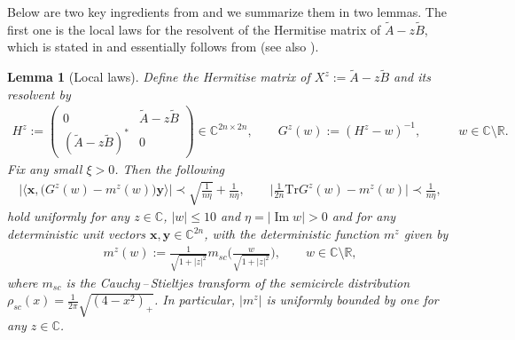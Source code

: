 \documentclass[10pt,reqno]{amsart}
\numberwithin{equation}{section}
\numberwithin{figure}{section}
\theoremstyle{plain}
\newtheorem{lemma}[theorem]{Lemma}
\newcommand{\R}{{\mathbb{R}}}
\newcommand{\C}{{\mathbb{C}}}
\newcommand{\A}{{\tilde{A}}}
\newcommand{\B}{{\tilde{B}}}
\newcommand{\<}{\langle}
\renewcommand{\>}{\rangle}
\renewcommand{\Im}{\operatorname{Im}}
\begin{document}
Below are two key ingredients from \cite{chafai-garcia-zelada-xu} and we summarize them in two lemmas. The first one is the local laws for the resolvent of the Hermitise matrix of $\A-z\B$, which is stated in \cite{chafai-garcia-zelada-xu} and essentially follows from \cite{zbMATH06347297} (see also \cite{zbMATH06221300,zbMATH06261246,zbMATH06330939}).
\begin{lemma}[Local laws]\label{lemma_local_law}
Define the Hermitise matrix of $X^z:=\A-z\B$ and its resolvent by
\begin{align}\label{eq_hermitise}
    H^{z}:=\begin{pmatrix}
		0  &   \A-z\B \\
		(\A-z\B)^*    & 0
	\end{pmatrix}  \in \C^{2n \times 2n}, \qquad G^{z}(w):=(H^{z}-w)^{-1}, \qquad \quad w \in \mathbb{C} \setminus \mathbb{R}.
\end{align}
Fix any small $\xi>0$. Then the following
	\begin{align}\label{eq:local_law_G_z}
		\Big| \big\langle \mathbf{x}, \big(G^z(w)-m^z(w)\big) \mathbf{y} \big\rangle \Big|  \prec \sqrt{
			\frac{1}{n \eta}}+\frac{1}{n\eta}, \qquad \Big|\frac{1}{2n}  \mathrm{Tr}G^{z}(w)-m^z(w)\Big|  \prec \frac{1}{n\eta},
	\end{align}
	hold uniformly for any $z \in \C$, $|w|\leq 10$ and $\eta=|\Im w| >0 $ and for any deterministic unit vectors $\mathbf{x}, \mathbf{y}\in \mathbb{C}^{2n}$, with the deterministic function $m^{z}$ given by
	\begin{align}\label{rho}
		m^{z}(w):=\frac{1}{\sqrt{1+|z|^2}} m_{sc}\Big( \frac{w}{\sqrt{1+|z|^2}}\Big), \qquad w\in \C \setminus \R,
	\end{align}
     where $m_{sc}$ is the Cauchy\,--\,Stieltjes transform of the semicircle distribution $\rho_{sc}(x)=\frac{1}{2 \pi} \sqrt{(4-x^2)_+}$. In particular, $|m^{z}|$ is uniformly bounded by one for any $z\in \C$.
     \end{lemma}
\end{document}
